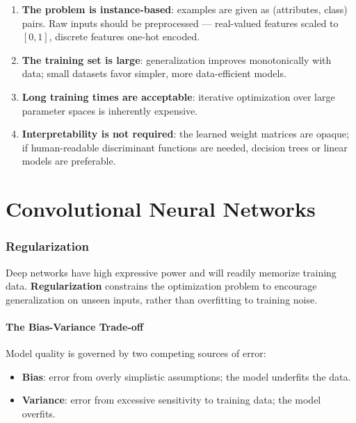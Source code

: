 \documentclass[11pt,a4paper]{article}
\theoremstyle{definition}
\theoremstyle{plain}
\theoremstyle{remark}
\begin{document}
\begin{enumerate}
    \item \textbf{The problem is instance-based}: examples are given as (attributes, class) pairs. Raw inputs should be preprocessed --- real-valued features scaled to $[0,1]$, discrete features one-hot encoded.
    \item \textbf{The training set is large}: generalization improves monotonically with data; small datasets favor simpler, more data-efficient models.
    \item \textbf{Long training times are acceptable}: iterative optimization over large parameter spaces is inherently expensive.
    \item \textbf{Interpretability is not required}: the learned weight matrices are opaque; if human-readable discriminant functions are needed, decision trees or linear models are preferable.
\end{enumerate}



\part{Convolutional Neural Networks}

\section{Regularization}

Deep networks have high expressive power and will readily memorize training data. \textbf{Regularization} constrains the optimization problem to encourage generalization on unseen inputs, rather than overfitting to training noise.

\subsection{The Bias-Variance Trade-off}

Model quality is governed by two competing sources of error:

\begin{itemize}
    \item \textbf{Bias}: error from overly simplistic assumptions; the model underfits the data.
    \item \textbf{Variance}: error from excessive sensitivity to training data; the model overfits.
\end{itemize}
\end{document}
